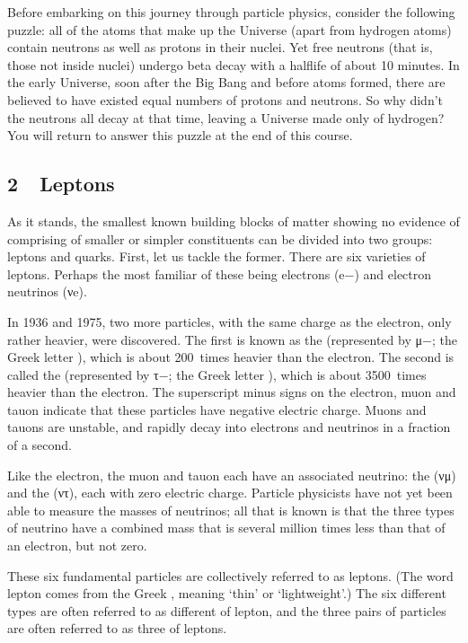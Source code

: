 \documentclass[letterpaper,10pt,english]{sphinxmanual}
\begin{document}
Before embarking on this journey through particle physics, consider the following puzzle: all of the atoms that make up the Universe (apart from hydrogen atoms) contain neutrons as well as protons in their nuclei. Yet free neutrons (that is, those not inside nuclei) undergo beta decay with a half\sphinxhyphen{}life of about 10 minutes. In the early Universe, soon after the Big Bang and before atoms formed, there are believed to have existed equal numbers of protons and neutrons. So why didn’t the neutrons all
decay at that time, leaving a Universe made only of hydrogen? You will return to answer this puzzle at the end of this course.


\subsection{2  Leptons}
\label{\detokenize{content/session_00/Part_00_02:2_xa0_xa0Leptons}}\label{\detokenize{content/session_00/Part_00_02::doc}}
As it stands, the smallest known building blocks of matter showing no evidence of comprising of smaller or simpler constituents can be divided into two groups: leptons and quarks. First, let us tackle the former. There are six varieties of leptons. Perhaps the most familiar of these being electrons (e−) and electron neutrinos (νe).

In 1936 and 1975, two more particles, with the same charge as the electron, only rather heavier, were discovered. The first is known as the  (represented by μ−; the Greek letter ), which is about 200 times heavier than the electron. The second is called the  (represented by τ−; the Greek letter ), which is about 3500 times heavier than the electron. The superscript minus signs on the electron, muon and tauon indicate that these particles have negative electric charge.
Muons and tauons are unstable, and rapidly decay into electrons and neutrinos in a fraction of a second.

Like the electron, the muon and tauon each have an associated neutrino: the (νμ) and the (ντ), each with zero electric charge. Particle physicists have not yet been able to measure the masses of neutrinos; all that is known is that the three types of neutrino have a combined mass that is several million times less than that of an electron, but not zero.

These six fundamental particles are collectively referred to as leptons. (The word lepton comes from the Greek , meaning ‘thin’ or ‘lightweight’.) The six different types are often referred to as different  of lepton, and the three pairs of particles are often referred to as three  of leptons.
\end{document}
